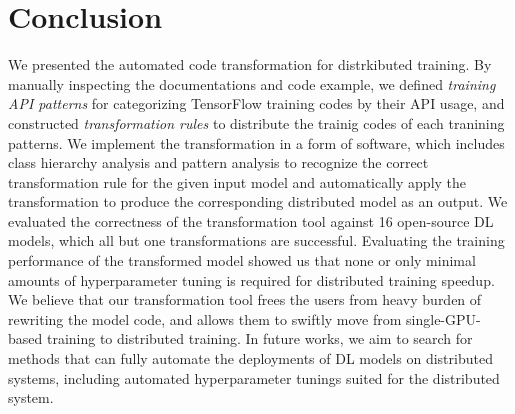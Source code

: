 \section{Conclusion}\label{sec:conclusion}

We presented the automated code transformation for distrkibuted training.  
By manually inspecting the documentations and code example,
we defined \textit{training API patterns} for categorizing TensorFlow
training codes by their API usage, and constructed \textit{transformation rules}
to distribute the trainig codes of each tranining patterns.
We implement the transformation in a form of software,
which includes class hierarchy analysis and pattern analysis to recognize
the correct transformation rule for the given input model
and automatically apply the transformation to produce
the corresponding distributed model as an output.
We evaluated the correctness of the transformation tool against
16 open-source DL models, which all but one transformations are
successful. Evaluating the training performance of the
transformed model showed us that none or only minimal amounts of
hyperparameter tuning is required for distributed training speedup. 
We believe that our transformation tool frees the users from
heavy burden of rewriting the model code, and allows them to
swiftly move from single-GPU-based training to distributed training.
In future works, we aim to search for methods that can fully automate
the deployments of DL models on distributed systems, including
automated hyperparameter tunings suited for the distributed system.
